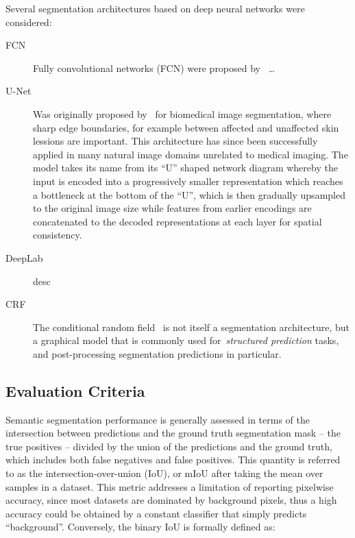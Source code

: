 \documentclass[11pt]{article} %
\begin{document}
Several segmentation architectures based on deep neural networks were
considered: 

\begin{description}
\item[FCN] Fully convolutional networks (FCN) were proposed 
by~\cite{long2015fully} \dots

\item[U-Net] Was originally proposed by~\cite{ronneberger2015unet} for 
biomedical image segmentation, where sharp edge boundaries, for example between 
affected and unaffected skin lessions are important. This architecture has 
since been successfully applied in many natural image domains unrelated to 
medical imaging. 
The model takes its name from its ``U'' shaped network diagram whereby the
input is encoded into a progressively smaller representation which reaches a 
bottleneck at the bottom of the ``U'', which is then gradually upsampled to the 
original image size while features from earlier encodings are concatenated to 
the decoded representations at each layer for spatial consistency.

\item[DeepLab] desc

\item[CRF] The conditional random field~\cite{krahenbuhl2011efficient} is not
itself a segmentation architecture, but a graphical model that is commonly used
for~\emph{structured prediction} tasks, and post-processing segmentation
predictions in particular.

\end{description}

\subsection{Evaluation Criteria}

Semantic segmentation performance is generally assessed in terms of the
intersection between predictions and the ground truth segmentation mask -- the
true positives -- divided by the union of the predictions and the ground truth, 
which includes both false negatives and false positives. This quantity is
referred to as the intersection-over-union (IoU), or mIoU after taking the
mean over samples in a dataset. This metric addresses a limitation of reporting 
pixelwise accuracy, since most datasets are dominated by background pixels,
thus a high accuracy could be obtained by a constant classifier that simply
predicts ``background''. Conversely, the binary IoU is formally defined as:
\end{document}
